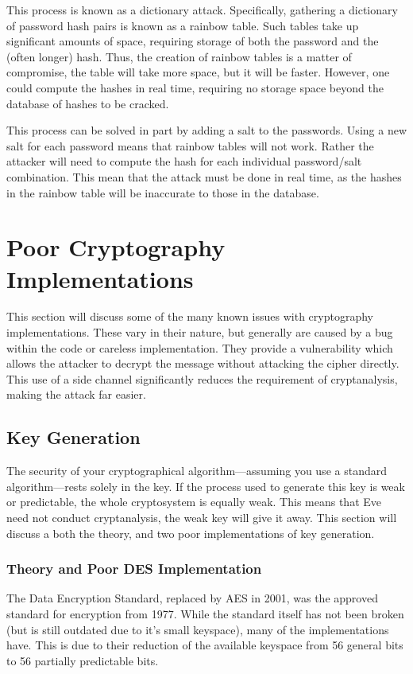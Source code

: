 		This process is known as a dictionary attack. 
		Specifically, gathering a dictionary of password hash pairs is known as a rainbow table. 
		Such tables take up significant amounts of space, requiring storage of both the password and the (often longer) hash. 
		Thus, the creation of rainbow tables is a matter of compromise, the table will take more space, but it will be faster. 
		However, one could compute the hashes in real time, requiring no storage space beyond the database of hashes to be cracked.

		This process can be solved in part by adding a salt to the passwords. 
		Using a new salt for each password means that rainbow tables will not work. 
		Rather the attacker will need to compute the hash for each individual password/salt combination. 
		This mean that the attack must be done in real time, as the hashes in the rainbow table will be inaccurate to those in the database. 
	\section{Poor Cryptography Implementations}
		This section will discuss some of the many known issues with cryptography implementations. 
		These vary in their nature, but generally are caused by a bug within the code or careless implementation. 
		They provide a vulnerability which allows the attacker to decrypt the message without attacking the cipher directly. 
		This use of a side channel significantly reduces the requirement of cryptanalysis, making the attack far easier. 
		\subsection{Key Generation}
			The security of your cryptographical algorithm---assuming you use a standard algorithm---rests solely in the key. 
			If the process used to generate this key is weak or predictable, the whole cryptosystem is equally weak. 
			This means that Eve need not conduct cryptanalysis, the weak key will give it away. 
			This section will discuss a both the theory, and two poor implementations of key generation. 

			\subsubsection{Theory and Poor DES Implementation}
				The Data Encryption Standard, replaced by AES in 2001, was the approved standard for encryption from 1977. 
				While the standard itself has not been broken (but is still outdated due to it's small keyspace), 
				many of the implementations have. 
				This is due to their reduction of the available keyspace from 56 general bits to 56 partially predictable bits.


